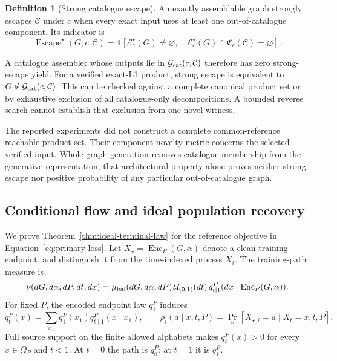 \documentclass{article}
\theoremstyle{definition}
\newtheorem{definition}[theorem]{Definition}
\begin{document}
\begin{definition}[Strong catalogue escape]
\label{def:catalogue-escape}
An exactly assemblable graph strongly escapes $\mathcal C$ under $c$ when every exact input uses
at least one out-of-catalogue component. Its indicator is
\begin{equation}
 \operatorname{Escape}^\star(G;c,\mathcal C)
 =\mathbf1\!\left[\mathcal E_c^\star(G)\neq\varnothing,\quad
 \mathcal E_c^\star(G)\cap\mathfrak C_c(\mathcal C)=\varnothing\right].
\end{equation}
\end{definition}
A catalogue assembler whose outputs lie in $\mathcal G_{\rm cat}(c,\mathcal C)$ therefore has
zero strong-escape yield. For a verified exact-L1 product, strong escape is equivalent to
$G\notin\mathcal G_{\rm cat}(c,\mathcal C)$. This can be checked against a complete canonical
product set or by exhaustive exclusion of all catalogue-only decompositions. A bounded reverse
search cannot establish that exclusion from one novel witness.

The reported experiments did not construct a complete common-reference reachable product set.
Their component-novelty metric concerns the selected verified input. Whole-graph generation removes
catalogue membership from the generative representation; that architectural property alone proves
neither strong escape nor positive probability of any particular out-of-catalogue graph.

\subsection{Conditional flow and ideal population recovery}
\label{app:flow-proof}

We prove Theorem~\ref{thm:ideal-terminal-law} for the reference objective in
Equation~\ref{eq:primary-loss}. Let $X_\star=\operatorname{Enc}_P(G,\alpha)$ denote a clean training
endpoint, and distinguish it from the time-indexed process $X_t$. The training-path measure is
\begin{equation}
 \nu(dG,d\alpha,dP,dt,dx)
 =\mu_{\rm bal}(dG,d\alpha,dP)\,\mathcal U_{(0,1)}(dt)\,
 q_{t\mid1}^P(dx\mid\operatorname{Enc}_P(G,\alpha)).
\end{equation}
For fixed $P$, the encoded endpoint law $q_1^P$ induces
\begin{equation}
 q_t^P(x)=\sum_{x_1}q_1^P(x_1)q_{t\mid1}^P(x\mid x_1),\qquad
 \rho_i(a\mid x,t,P)=\Pr_\nu[X_{\star,i}=a\mid X_t=x,t,P].
 \label{eq:population-path}
\end{equation}
Full source support on the finite allowed alphabets makes $q_t^P(x)>0$ for every $x\in\Omega_P$
and $t<1$. At $t=0$ the path is $q_0^P$; at $t=1$ it is $q_1^P$.
\end{document}
